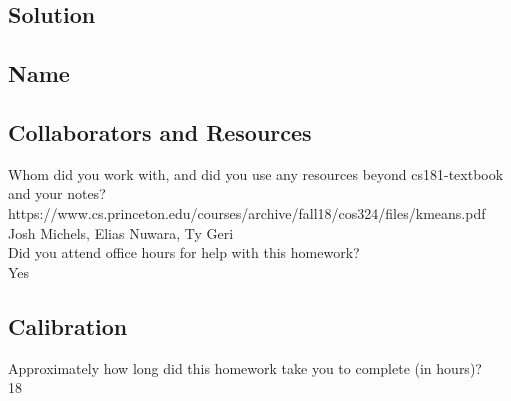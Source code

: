 \documentclass[submit]{harvardml}
\begin{document}
\subsection*{Solution}

\newpage
\subsection*{Name}

\subsection*{Collaborators and Resources}
Whom did you work with, and did you use any resources beyond cs181-textbook and your notes?\\
https://www.cs.princeton.edu/courses/archive/fall18/cos324/files/kmeans.pdf\\
Josh Michels, Elias Nuwara, Ty Geri\\

Did you attend office hours for help with this homework?\\
Yes

\subsection*{Calibration}
Approximately how long did this homework take you to complete (in hours)?\\
18
\end{document}
